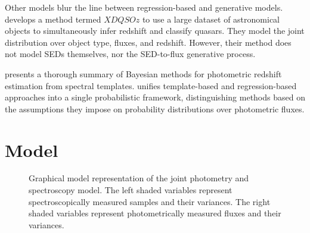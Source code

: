 \documentclass{article}
\newcommand{\red}[1]{\textcolor{red}{[TODO: #1]}}
\begin{document}
Other models blur the line between regression-based and generative models.  \citet{bovy2012photometric} develops a method termed $XDQSOz$ to use a large dataset of astronomical objects to simultaneously infer redshift and classify quasars.  
They model the joint distribution over object type, fluxes, and redshift.  However, their method does not model SEDs themselves, nor the SED-to-flux generative process. 

\citet{benitez2000bayesian} presents a thorough summary of Bayesian methods for photometric redshift estimation from spectral templates.  
\citet{budavari2009unified} unifies template-based and regression-based
approaches into a single probabilistic framework, distinguishing methods based on the assumptions they impose on probability distributions over photometric fluxes. 



\section{Model}

\begin{figure}

\caption{Graphical model representation of the joint photometry and spectroscopy model.  The left shaded variables represent spectroscopically measured samples and their variances.  The right shaded variables represent photometrically measured fluxes and their variances. }
\label{fig:graphical}
\end{figure}
\end{document}

